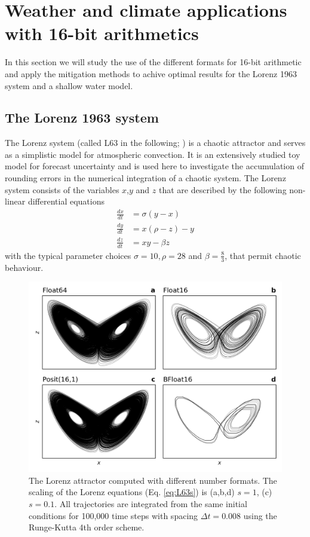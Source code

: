 \documentclass[draft]{agujournal2019}
\begin{document}
\section{Weather and climate applications with 16-bit arithmetics}
\label{sec:runs}

In this section we will study the use of the different formats for 16-bit arithmetic and apply the mitigation methods to achive optimal results for the Lorenz 1963 system and a shallow water model.

\subsection{The Lorenz 1963 system}
\label{sec:L63}

The Lorenz system (called L63 in the following; \cite{Lorenz1963}) is a chaotic attractor and serves as a simplistic model for atmospheric convection. It is an extensively studied toy model for forecast uncertainty \cite{Lorenz1963,Kwasniok2014,Jeffress2017,Tantet2018} and is used here to investigate the accumulation of rounding errors in the numerical integration of a chaotic system. The Lorenz system consists of the variables $x$,$y$ and $z$ that are described by the following non-linear differential equations
\begin{subequations}
\begin{align}
\frac{dx}{dt} &= \sigma(y-x) \\
\frac{dy}{dt} &= x(\rho - z) - y \\
\frac{dz}{dt} &= xy - \beta z
\end{align}
\label{eq:L63}%
\end{subequations}
with the typical parameter choices $\sigma = 10, \rho = 28$ and $\beta = \tfrac{8}{3}$, that permit chaotic behaviour.

\begin{figure}
\includegraphics[width=1\textwidth]{../plots/lorenz_attractor.png}
\caption{The Lorenz attractor computed with different number formats. The scaling of the Lorenz equations (Eq. \ref{eq:L63s}) is (a,b,d) $s=1$, (c) $s=0.1$. All trajectories are integrated from the same initial conditions for 100,000 time steps with spacing $\Delta t = 0.008$ using the Runge-Kutta 4th order scheme.}
\label{fig:L63}
\end{figure}
\end{document}
